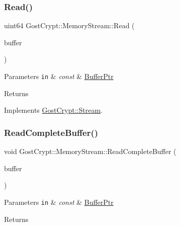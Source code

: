 \subsubsection{\texorpdfstring{Read()}{Read()}}
{\footnotesize\ttfamily uint64 Gost\+Crypt\+::\+Memory\+Stream\+::\+Read (\begin{DoxyParamCaption}\item[{const \hyperlink{class_gost_crypt_1_1_buffer_ptr}{Buffer\+Ptr} \&}]{buffer }\end{DoxyParamCaption})\hspace{0.3cm}{\ttfamily [virtual]}}


\begin{DoxyParams}[1]{Parameters}
\mbox{\tt in}  & {\em const} & \hyperlink{class_gost_crypt_1_1_buffer_ptr}{Buffer\+Ptr} \\
\hline
\end{DoxyParams}
\begin{DoxyReturn}{Returns}

\end{DoxyReturn}


Implements \hyperlink{class_gost_crypt_1_1_stream}{Gost\+Crypt\+::\+Stream}.

\mbox{\label{class_gost_crypt_1_1_memory_stream_a30c43526f22ef1ab2c46659111044f2a}} 
\subsubsection{\texorpdfstring{Read\+Complete\+Buffer()}{ReadCompleteBuffer()}}
{\footnotesize\ttfamily void Gost\+Crypt\+::\+Memory\+Stream\+::\+Read\+Complete\+Buffer (\begin{DoxyParamCaption}\item[{const \hyperlink{class_gost_crypt_1_1_buffer_ptr}{Buffer\+Ptr} \&}]{buffer }\end{DoxyParamCaption})\hspace{0.3cm}{\ttfamily [virtual]}}


\begin{DoxyParams}[1]{Parameters}
\mbox{\tt in}  & {\em const} & \hyperlink{class_gost_crypt_1_1_buffer_ptr}{Buffer\+Ptr} \\
\hline
\end{DoxyParams}
\begin{DoxyReturn}{Returns}

\end{DoxyReturn}


